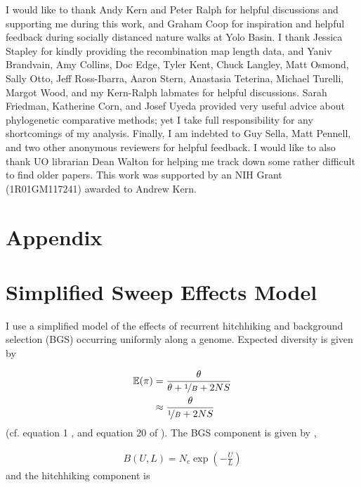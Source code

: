 \documentclass[11pt]{article}
\newcommand{\E}{\mathbb{E}}
\begin{document}
I would like to thank Andy Kern and Peter Ralph for helpful discussions and
supporting me during this work, and Graham Coop for inspiration and helpful
feedback during socially distanced nature walks at Yolo Basin. I thank Jessica
Stapley for kindly providing the recombination map length data, and Yaniv
Brandvain, Amy Collins, Doc Edge, Tyler Kent, Chuck Langley, Matt Osmond, Sally
Otto, Jeff Ross-Ibarra, Aaron Stern, Anastasia Teterina, Michael Turelli,
Margot Wood, and my Kern-Ralph labmates for helpful discussions. Sarah
Friedman, Katherine Corn, and Josef Uyeda provided very useful advice about
phylogenetic comparative methods; yet I take full responsibility for any
shortcomings of my analysis. Finally, I am indebted to Guy Sella, Matt Pennell,
and two other anonymous reviewers for helpful feedback. I would like to also
thank UO librarian Dean Walton for helping me track down some rather difficult
to find older papers.  This work was supported by an NIH Grant (1R01GM117241)
awarded to Andrew Kern.

\section*{Appendix}

\setcounter{table}{0}
\renewcommand{\theequation}{A\arabic{equation}}
\setcounter{section}{0}
\renewcommand{\thesection}{A\arabic{section}}
\setcounter{figure}{0}
\renewcommand{\thefigure}{A\arabic{figure}}


\section{Simplified Sweep Effects Model}
\label{app:sweep}

I use a simplified model of the effects of recurrent hitchhiking and background
selection (BGS) occurring uniformly along a genome. Expected diversity is given
by

\begin{align}
  \E(\pi) &= \frac{\theta}{\theta + \nicefrac{1}{B} + 2NS} \\
          &\approx \frac{\theta}{\nicefrac{1}{B} + 2NS} 
\end{align}
%
(cf. equation 1 \cite{Elyashiv2016-vt}, and equation 20 of \cite{Coop2012-cd}).
The BGS component is given by \textcite{Hudson1995-xc},

\begin{align}
  B(U, L) = N_e \exp\left(-\frac{U}{L}\right)
\end{align}
%
and the hitchhiking component is
\end{document}
